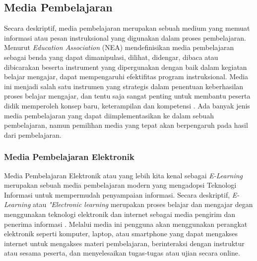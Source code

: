 \subsection{Media Pembelajaran}
Secara deskriptif, media pembelajaran merupakan sebuah medium yang memuat informasi atau pesan instruksional yang digunakan dalam proses pembelajaran\cite{hasan2021media}. 
Menurut \textit{Education Association} (NEA) mendefinisikan media pembelajaran sebagai benda yang dapat dimanipulasi, dilihat, didengar, dibaca atau dibicarakan 
beserta instrument yang dipergunakan dengan baik dalam kegiatan belajar mengajar, dapat mempengaruhi efektifitas program instruksional\cite{arsyad2011media}.
Media ini menjadi salah satu instrumen yang strategis dalam penentuan keberhasilan proses belajar mengajar, dan tentu saja sangat penting untuk membantu peserta didik memperoleh konsep baru, keterampilan dan kompetensi \cite{hasan2021media}.
Ada banyak jenis media pembelajaran yang dapat diimplementasikan ke dalam sebuah pembelajaran, namun pemilihan media yang tepat akan berpengaruh pada hasil dari pembelajaran.
\subsubsection{Media Pembelajaran Elektronik}
Media Pembelajaran Elektronik atau yang lebih kita kenal sebagai \textit{E-Learning} merupakan sebuah media pembelajaran modern yang mengadopsi Teknologi Informasi untuk mempermudah penyampaian informasi.
Secara deskriptif, \textit{E-Learning} atau \textit{"Electronic learning} merupakan proses belajar dan mengajar degan menggunakan teknologi elektronik dan internet sebagai media pengirim dan penerima informasi \cite{hanum2013keefetifan}.
Melalui media ini pengguna akan menggunakan perangkat elektronik seperti komputer, laptop, atau smartphone yang dapat mengakses internet untuk mengakses materi pembelajaran, berinteraksi dengan instruktur atau sesama peserta, dan menyelesaikan tugas-tugas atau ujian secara online.
